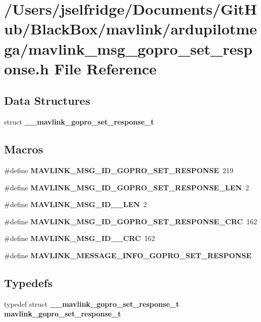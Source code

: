 \section{/\+Users/jselfridge/\+Documents/\+Git\+Hub/\+Black\+Box/mavlink/ardupilotmega/mavlink\+\_\+msg\+\_\+gopro\+\_\+set\+\_\+response.h File Reference}
\label{mavlink__msg__gopro__set__response_8h}
\subsection*{Data Structures}
\begin{DoxyCompactItemize}
\item 
struct \textbf{ \+\_\+\+\_\+mavlink\+\_\+gopro\+\_\+set\+\_\+response\+\_\+t}
\end{DoxyCompactItemize}
\subsection*{Macros}
\begin{DoxyCompactItemize}
\item 
\#define \textbf{ M\+A\+V\+L\+I\+N\+K\+\_\+\+M\+S\+G\+\_\+\+I\+D\+\_\+\+G\+O\+P\+R\+O\+\_\+\+S\+E\+T\+\_\+\+R\+E\+S\+P\+O\+N\+SE}~219
\item 
\#define \textbf{ M\+A\+V\+L\+I\+N\+K\+\_\+\+M\+S\+G\+\_\+\+I\+D\+\_\+\+G\+O\+P\+R\+O\+\_\+\+S\+E\+T\+\_\+\+R\+E\+S\+P\+O\+N\+S\+E\+\_\+\+L\+EN}~2
\item 
\#define \textbf{ M\+A\+V\+L\+I\+N\+K\+\_\+\+M\+S\+G\+\_\+\+I\+D\+\_\+\_\+\+L\+EN}~2
\item 
\#define \textbf{ M\+A\+V\+L\+I\+N\+K\+\_\+\+M\+S\+G\+\_\+\+I\+D\+\_\+\+G\+O\+P\+R\+O\+\_\+\+S\+E\+T\+\_\+\+R\+E\+S\+P\+O\+N\+S\+E\+\_\+\+C\+RC}~162
\item 
\#define \textbf{ M\+A\+V\+L\+I\+N\+K\+\_\+\+M\+S\+G\+\_\+\+I\+D\+\_\+\_\+\+C\+RC}~162
\item 
\#define \textbf{ M\+A\+V\+L\+I\+N\+K\+\_\+\+M\+E\+S\+S\+A\+G\+E\+\_\+\+I\+N\+F\+O\+\_\+\+G\+O\+P\+R\+O\+\_\+\+S\+E\+T\+\_\+\+R\+E\+S\+P\+O\+N\+SE}
\end{DoxyCompactItemize}
\subsection*{Typedefs}
\begin{DoxyCompactItemize}
\item 
typedef struct \textbf{ \+\_\+\+\_\+mavlink\+\_\+gopro\+\_\+set\+\_\+response\+\_\+t} \textbf{ mavlink\+\_\+gopro\+\_\+set\+\_\+response\+\_\+t}
\end{DoxyCompactItemize}


